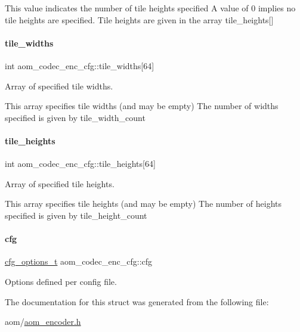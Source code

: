 This value indicates the number of tile heights specified A value of 0 implies no tile heights are specified. Tile heights are given in the array tile\+\_\+heights\mbox{[}\mbox{]} \mbox{\label{structaom__codec__enc__cfg_ab03c0c96d42faaa8a3d697d4d283afcf}} 
\paragraph{\texorpdfstring{tile\+\_\+widths}{tile\_widths}}
{\footnotesize\ttfamily int aom\+\_\+codec\+\_\+enc\+\_\+cfg\+::tile\+\_\+widths\mbox{[}64\mbox{]}}



Array of specified tile widths. 

This array specifies tile widths (and may be empty) The number of widths specified is given by tile\+\_\+width\+\_\+count \mbox{\label{structaom__codec__enc__cfg_a7859761b70f5a44005dfd776e7c2f79d}} 
\paragraph{\texorpdfstring{tile\+\_\+heights}{tile\_heights}}
{\footnotesize\ttfamily int aom\+\_\+codec\+\_\+enc\+\_\+cfg\+::tile\+\_\+heights\mbox{[}64\mbox{]}}



Array of specified tile heights. 

This array specifies tile heights (and may be empty) The number of heights specified is given by tile\+\_\+height\+\_\+count \mbox{\label{structaom__codec__enc__cfg_a91c4b8e91211a9cea98a8003ef2e4e65}} 
\paragraph{\texorpdfstring{cfg}{cfg}}
{\footnotesize\ttfamily \hyperlink{group__codec_ga58cddec4492c70945a2b4c3773c665b0}{cfg\+\_\+options\+\_\+t} aom\+\_\+codec\+\_\+enc\+\_\+cfg\+::cfg}



Options defined per config file. 



The documentation for this struct was generated from the following file\+:\begin{DoxyCompactItemize}
\item 
aom/\hyperlink{aom__encoder_8h}{aom\+\_\+encoder.\+h}\end{DoxyCompactItemize}
